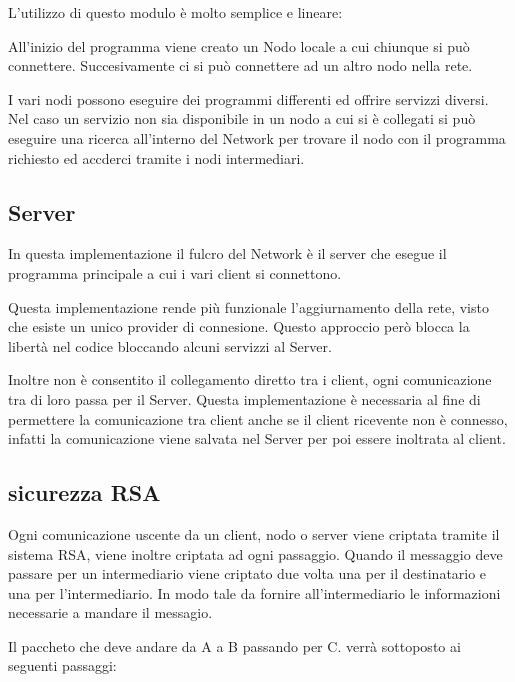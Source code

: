 \documentclass{article}
\begin{document}
L'utilizzo di questo modulo è molto semplice e lineare:

All'inizio del programma viene creato un Nodo locale a cui chiunque si può connettere. Succesivamente ci si può connettere ad un altro nodo nella rete.

I vari nodi possono eseguire dei programmi differenti ed offrire servizzi diversi. Nel caso un servizio non sia disponibile in un nodo a cui si è collegati si può eseguire una ricerca all'interno del Network per trovare il nodo con il programma richiesto ed accderci tramite i nodi intermediari.

\subsection{Server}
In questa implementazione il fulcro del Network è il server che esegue il programma principale a cui i vari client si connettono.

Questa implementazione rende più funzionale l'aggiurnamento della rete, visto che esiste un unico provider di connesione. Questo approccio però blocca la libertà nel codice bloccando alcuni servizzi al Server. 

Inoltre non è consentito il collegamento diretto tra i client, ogni comunicazione tra di loro passa per il Server. Questa implementazione è necessaria al fine di permettere la comunicazione tra client anche se il client ricevente non è connesso, infatti la comunicazione viene salvata nel Server per poi essere inoltrata al client.

\subsection{sicurezza RSA}
Ogni comunicazione uscente da un client, nodo o server viene criptata tramite il sistema RSA, viene inoltre criptata ad ogni passaggio. Quando il messaggio deve passare per un intermediario viene criptato due volta una per il destinatario e una per l'intermediario. In modo tale da fornire all'intermediario le informazioni necessarie a mandare il messagio.

Il paccheto che deve andare da A a B passando per C. verrà sottoposto ai seguenti passaggi:
\end{document}
